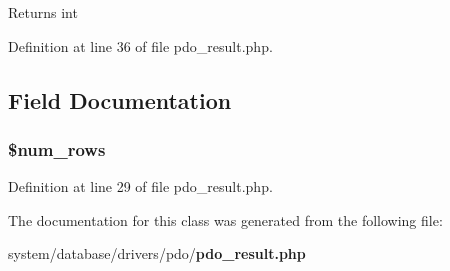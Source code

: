 \begin{DoxyReturn}{Returns}
int 
\end{DoxyReturn}


Definition at line 36 of file pdo\-\_\-result.\-php.



\subsection{Field Documentation}
\subsubsection[{\$num\-\_\-rows}]{\setlength{\rightskip}{0pt plus 5cm}\${\bf num\-\_\-rows}}\label{class_c_i___d_b__pdo__result_ac926549b713e71c5f5fd63999cebfb8c}


Definition at line 29 of file pdo\-\_\-result.\-php.



The documentation for this class was generated from the following file\-:\begin{DoxyCompactItemize}
\item 
system/database/drivers/pdo/{\bf pdo\-\_\-result.\-php}\end{DoxyCompactItemize}
